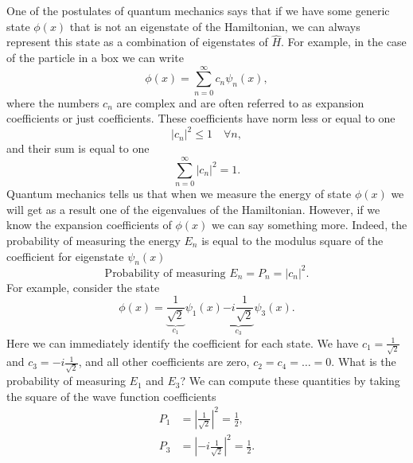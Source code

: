 \documentclass[../Main/chem331-notes.tex]{subfiles}
\begin{document}
One of the postulates of quantum mechanics says that if we have some generic state $\phi(x)$ that is not an eigenstate of the Hamiltonian, we can always represent this state as a combination of eigenstates of $\hat{H}$. For example, in the case of the particle in a box we can write
\begin{equation}
\phi(x) = \sum_{n = 0}^\infty c_n \psi_n(x),
\end{equation}
where the numbers $c_n$ are complex and are often referred to as expansion coefficients or just coefficients.
These coefficients have norm less or equal to one
\begin{equation}
|c_n|^2 \leq 1 \quad \forall n,
\end{equation}
and their sum is equal to one
\begin{equation}
\sum_{n = 0}^\infty |c_n|^2 = 1.
\end{equation}
Quantum mechanics tells us that when we measure the energy of state $\phi(x)$ we will get as a result one of the eigenvalues of the Hamiltonian.
However, if we know the expansion coefficients of $\phi(x)$ we can say something more.
Indeed, the probability of measuring the energy $E_n$ is equal to the modulus square of the coefficient for eigenstate $\psi_n(x)$
\begin{equation}
\text{Probability of measuring } E_n = P_n = |c_n|^2.
\end{equation}
For example, consider the state
\begin{equation}
\phi(x) = \underbrace{\frac{1}{\sqrt{2}}}_{c_1} \psi_1(x) \underbrace{- i \frac{1}{\sqrt{2}}}_{c_3} \psi_3(x).
\end{equation}
Here we can immediately identify the coefficient for each state. We have $c_1 = \frac{1}{\sqrt{2}}$ and $c_3 = - i \frac{1}{\sqrt{2}}$, and all other coefficients are zero, $c_2 = c_4 = \ldots = 0$.
What is the probability of measuring $E_1$ and $E_3$? We can compute these quantities by taking the square of the wave function coefficients
\begin{equation}
\begin{split}
P_1 &= \left|\frac{1}{\sqrt{2}}\right|^2 = \frac{1}{2},\\
P_3 &= \left|-i\frac{1}{\sqrt{2}}\right|^2 = \frac{1}{2}.
\end{split}
\end{equation}
\end{document}
